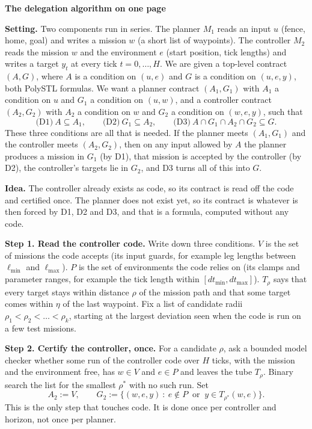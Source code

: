 \documentclass[10pt]{article}
\begin{document}
{\Large\bfseries The delegation algorithm on one page}

\textbf{Setting.} Two components run in series. The planner $M_1$ reads an input $u$ (fence, home, goal) and writes a mission $w$ (a short list of waypoints). The controller $M_2$ reads the mission $w$ and the environment $e$ (start position, tick lengths) and writes a target $y_t$ at every tick $t=0,\dots,H$. We are given a top-level contract $(A,G)$, where $A$ is a condition on $(u,e)$ and $G$ is a condition on $(u,e,y)$, both PolySTL formulas. We want a planner contract $(A_1,G_1)$ with $A_1$ a condition on $u$ and $G_1$ a condition on $(u,w)$, and a controller contract $(A_2,G_2)$ with $A_2$ a condition on $w$ and $G_2$ a condition on $(w,e,y)$, such that
\[
\text{(D1)}\ A\subseteq A_1,\qquad \text{(D2)}\ G_1\subseteq A_2,\qquad \text{(D3)}\ A\cap G_1\cap A_2\cap G_2\subseteq G .
\]
These three conditions are all that is needed. If the planner meets $(A_1,G_1)$ and the controller meets $(A_2,G_2)$, then on any input allowed by $A$ the planner produces a mission in $G_1$ (by D1), that mission is accepted by the controller (by D2), the controller's targets lie in $G_2$, and D3 turns all of this into $G$.

\textbf{Idea.} The controller already exists as code, so its contract is read off the code and certified once. The planner does not exist yet, so its contract is whatever is then forced by D1, D2 and D3, and that is a formula, computed without any code.

\textbf{Step 1. Read the controller code.} Write down three conditions. $V$ is the set of missions the code accepts (its input guards, for example leg lengths between $\ell_{\min}$ and $\ell_{\max}$). $P$ is the set of environments the code relies on (its clamps and parameter ranges, for example the tick length within $[dt_{\min},dt_{\max}]$). $T_\rho$ says that every target stays within distance $\rho$ of the mission path and that some target comes within $\eta$ of the last waypoint. Fix a list of candidate radii $\rho_1<\rho_2<\dots<\rho_k$, starting at the largest deviation seen when the code is run on a few test missions.

\textbf{Step 2. Certify the controller, once.} For a candidate $\rho$, ask a bounded model checker whether some run of the controller code over $H$ ticks, with the mission and the environment free, has $w\in V$ and $e\in P$ and leaves the tube $T_\rho$. Binary search the list for the smallest $\rho^*$ with no such run. Set
\[
A_2:=V,\qquad G_2:=\{(w,e,y)\ :\ e\notin P\ \text{ or }\ y\in T_{\rho^*}(w,e)\}.
\]
This is the only step that touches code. It is done once per controller and horizon, not once per planner.
\end{document}
